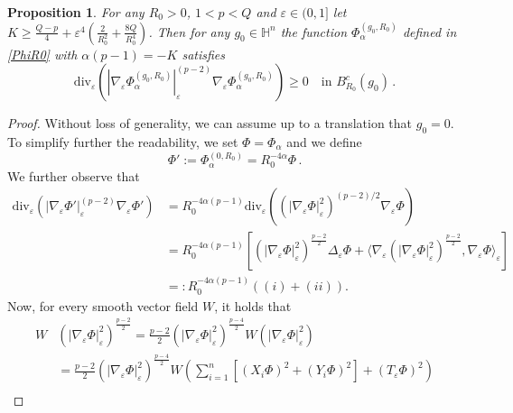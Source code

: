 \documentclass[10pt,a4paper]{amsart}
\newtheorem{proposition}{Proposition}
\newcommand{\eT}{T_{\eps}}
\newcommand{\egrad}{\nabla_{\eps}}
\newcommand{\eps}{\varepsilon}
\newcommand{\escal}[2]{\langle {#1},{#2}\rangle_{\eps}}
\begin{document}
\begin{proposition}\label{SubBarrier}
For any $R_0>0$, $1<p<Q$ and $\varepsilon \in (0,1]$ let $K\geq \frac{Q-p}4 + \varepsilon^4 \left(\frac{2}{R_0^2} +  \frac{8 Q}{R_0^4} \right) $. Then for any $g_0 \in \mathbb{H}^n$ the function $\Phi^{(g_0, R_0)}_{\alpha}$ defined in \eqref{PhiR0} with $\alpha (p-1) = -K$ satisfies
\begin{equation}\label{goal}
\mathrm{div}_{\eps}\left(  |\nabla_{\eps} \Phi^{(g_0, R_0)}_{\alpha}|_{\eps}^{(p-2)}\nabla_{\eps}\Phi^{(g_0, R_0)}_{\alpha} \right) \geq 0 \quad \textrm{in } B^{c}_{R_0}(g_0) \, .
\end{equation}
\end{proposition}

\begin{proof}
Without loss of generality, we can assume up to a translation that $g_0 = 0$. To simplify further the
readability, we set $\Phi=\Phi_{\alpha}$ and we define 
\begin{equation}\label{def:Phi'}
  \Phi':= \Phi^{(0, R_0)}_{\alpha} = R_{0}^{-4\alpha} \Phi \, .
  \end{equation}
We further observe that
\begin{equation}
\label{decpepslap}
\begin{aligned}
\mathrm{div}_{\eps}\left(  |\nabla_{\eps} \Phi'|_{\eps}^{(p-2)}\nabla_{\eps}\Phi' \right) &= R_{0}^{-4\alpha (p-1)} \mathrm{div}_{\eps}\left( \left( |\nabla_{\eps} \Phi|_{\eps}^{2}\right)^{(p-2)/2}\nabla_{\eps}\Phi \right) \\
&= R_{0}^{-4\alpha (p-1)} \left[\left(|\egrad \Phi|_\varepsilon^2 \right)^{\tfrac{p-2}{2}} \Delta_{\eps}\Phi + \escal{\egrad \left(|\egrad \Phi|_\varepsilon^{2} \right)^{\tfrac{p-2}{2}}}{\egrad \Phi}\right]\\
&=: R_{0}^{-4\alpha (p-1)} \left( (i) + (ii) \right).
\end{aligned}
\end{equation}
Now, for every smooth vector field $W$, it holds that
\begin{equation}
\label{Waction}
\begin{aligned} 
W &\left(|\egrad \Phi|_\varepsilon^2 \right)^{\tfrac{p-2}{2}} = \tfrac{p-2}{2} \left(|\egrad \Phi|_\varepsilon^2 \right)^{\tfrac{p-4}{2}} W (|\egrad \Phi|_\varepsilon^{2})\\
&= \tfrac{p-2}{2} \left(|\egrad \Phi|_\varepsilon^2 \right)^{\tfrac{p-4}{2}} W \left( \sum_{i=1}^{n}\left[(X_i \Phi)^2 + (Y_i \Phi)^2\right] + (\eT \Phi)^2 \right) \\

\end{aligned}
\end{equation}
\end{proof}
\end{document}

